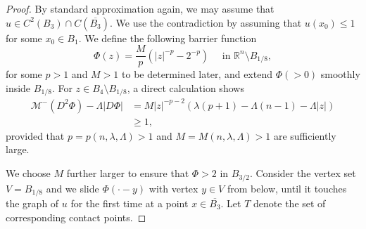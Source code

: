 \documentclass[10pt,a4paper]{amsart}
\begin{document}
\begin{proof}
By standard approximation again, we may assume that $u\in C^2(B_3)\cap C(\overline{B_3})$. We use the contradiction by assuming that $u(x_0) \leq 1$ for some $x_0 \in B_{1}$.
We define the following barrier function
\begin{equation*}
    \Phi(z) =  \frac{M}{p}(|z|^{-p}-2^{-p}) \quad \text { in } \mathbb{R}^n\setminus B_{1/8},
\end{equation*}
for some $p>1$ and $M>1$ to be determined later, and extend $\Phi (>0)$ smoothly inside $B_{1/8}$. For $z \in B_4\setminus B_{1/8}$, a direct calculation shows
\begin{equation} 
\begin{aligned}\label{barrierPDE}
    \mathcal{M}^-(D^2\Phi) -\Lambda|D\Phi| &= M |z|^{-p-2}(\lambda(p+1)- \Lambda(n-1) - \Lambda|z|) \\
    &\geq 1, 
\end{aligned}    
\end{equation}
provided that $p=p(n,\lambda,\Lambda)>1$ and $M=M(n,\lambda,\Lambda)>1$ are sufficiently large.

We choose $M$ further larger to ensure that $\Phi >2$ in $B_{3/2}$.
Consider the vertex set $V = B_{1/8}$ and we slide $\Phi(\cdot-y)$ with vertex $y \in V$ from below, until it touches the graph of $u$ for the first time at a point $x \in \overline{B_3}$. Let $T$ denote the set of corresponding contact points.


\end{proof}
\end{document}
